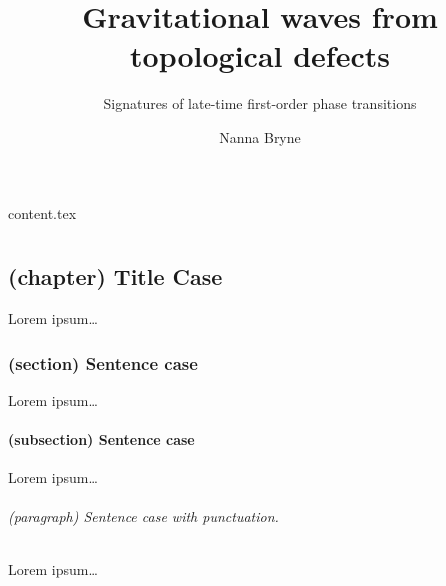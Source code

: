 \documentclass[UKenglish]{texmex/uiomasterthesis}
\title{Gravitational waves from topological defects}
\subtitle{Signatures of late-time first-order phase transitions}
\author{Nanna Bryne}
\begin{document}
% 



\uiomasterfp[
    dept={Institute of Theoretical Astrophysics\and Department of Physics},
    program={CS:~Astrophysics}, 
    supervisor={David Fonseca Mota}, %
    color={blue},
    fgimage={starry-night.png},
    long] 






\frontmatter{}
\tableofcontents{}



\begin{nomen}
    {content.tex}
\end{nomen}





\mainmatter{}


\part*{}%

\chapter*{(chapter) Title Case}
Lorem ipsum\dots
\section*{(section) Sentence case}
Lorem ipsum\dots
\subsection*{(subsection) Sentence case}
Lorem ipsum\dots

\paragraph*{(paragraph) Sentence case with punctuation.} %
Lorem ipsum\dots
\end{document}
